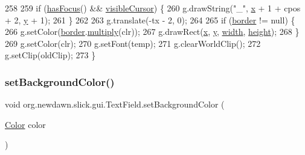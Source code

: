 \begin{DoxyCode}
258 
259         \textcolor{keywordflow}{if} (\mbox{\hyperlink{classorg_1_1newdawn_1_1slick_1_1gui_1_1_abstract_component_a9dc45673bb368814f9e48ea846953abd}{hasFocus}}() && \mbox{\hyperlink{classorg_1_1newdawn_1_1slick_1_1gui_1_1_text_field_af9a8a737887d06968db25185b999f5d0}{visibleCursor}}) \{
260             g.drawString(\textcolor{stringliteral}{"\_"}, \mbox{\hyperlink{classorg_1_1newdawn_1_1slick_1_1gui_1_1_text_field_a05dd91af6b1552f194c1aadbdf894c8c}{x}} + 1 + cpos + 2, \mbox{\hyperlink{classorg_1_1newdawn_1_1slick_1_1gui_1_1_text_field_acb0df9f048eabd20f6d5d40799b48706}{y}} + 1);
261         \}
262 
263         g.translate(-tx - 2, 0);
264 
265         \textcolor{keywordflow}{if} (\mbox{\hyperlink{classorg_1_1newdawn_1_1slick_1_1gui_1_1_text_field_a6a2e66c20955c3523577a527524b6227}{border}} != null) \{
266             g.setColor(\mbox{\hyperlink{classorg_1_1newdawn_1_1slick_1_1gui_1_1_text_field_a6a2e66c20955c3523577a527524b6227}{border}}.\mbox{\hyperlink{classorg_1_1newdawn_1_1slick_1_1_color_a7531e1b247c0d75639790cbb84867a39}{multiply}}(clr));
267             g.drawRect(\mbox{\hyperlink{classorg_1_1newdawn_1_1slick_1_1gui_1_1_text_field_a05dd91af6b1552f194c1aadbdf894c8c}{x}}, \mbox{\hyperlink{classorg_1_1newdawn_1_1slick_1_1gui_1_1_text_field_acb0df9f048eabd20f6d5d40799b48706}{y}}, \mbox{\hyperlink{classorg_1_1newdawn_1_1slick_1_1gui_1_1_text_field_aa0b76a23e9820ca0c01294f8de515b8e}{width}}, \mbox{\hyperlink{classorg_1_1newdawn_1_1slick_1_1gui_1_1_text_field_ad3a2b3a6afaee86e3c3a186b79a49564}{height}});
268         \}
269         g.setColor(clr);
270         g.setFont(temp);
271         g.clearWorldClip();
272         g.setClip(oldClip);
273     \}
\end{DoxyCode}
\mbox{\label{classorg_1_1newdawn_1_1slick_1_1gui_1_1_text_field_adcd0242636807d6e4223b3c5238ec354}} 
\subsubsection{\texorpdfstring{set\+Background\+Color()}{setBackgroundColor()}}
{\footnotesize\ttfamily void org.\+newdawn.\+slick.\+gui.\+Text\+Field.\+set\+Background\+Color (\begin{DoxyParamCaption}\item[{\mbox{\hyperlink{classorg_1_1newdawn_1_1slick_1_1_color}{Color}}}]{color }\end{DoxyParamCaption})\hspace{0.3cm}{\ttfamily [inline]}}

